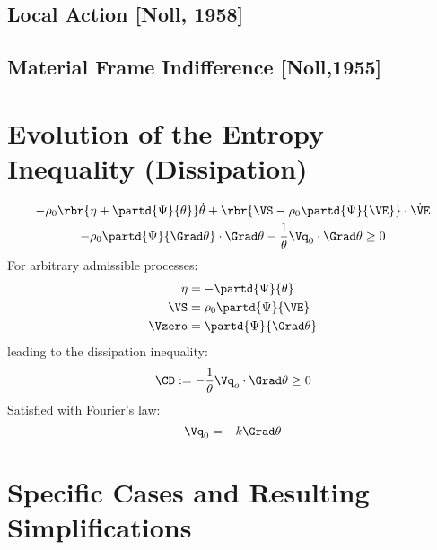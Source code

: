 \documentclass[a5paper,twosided,11pt,DIV=15,BCOR=0mm]{scrbook}
\begin{document}
\subsection{Local Action [Noll, 1958]}
\subsection{Material Frame Indifference [Noll,1955]}
%
\section{Evolution of the Entropy Inequality (Dissipation)}
\begin{multline}
  - \rho_0\rbr{\eta+\partd{\Psi}{\theta}}\dot{\theta}
  + \rbr{\VS-\rho_0\partd{\Psi}{\VE}}\cdot\dot{\VE}\\
  - \rho_0\partd{\Psi}{\Grad\theta}\cdot\Grad\theta
  - \frac{1}{\theta}\Vq_0\cdot\Grad\theta \geq 0
\end{multline}
For arbitrary admissible processes:
\begin{subequations}
  \begin{align}
    \eta&=-\partd{\Psi}{\theta}\\
    \VS&=\rho_0\partd{\Psi}{\VE}\\
    \Vzero &= \partd{\Psi}{\Grad\theta}
  \end{align}
\end{subequations}
leading to the dissipation inequality:
%
\begin{equation}
  \CD := -\frac{1}{\theta}\Vq_o\cdot\Grad\theta \geq 0
\end{equation}
%
Satisfied with Fourier's law:
\begin{equation}
  \Vq_0=-k\Grad\theta
\end{equation}
%
\section{Specific Cases and Resulting Simplifications}
\end{document}

